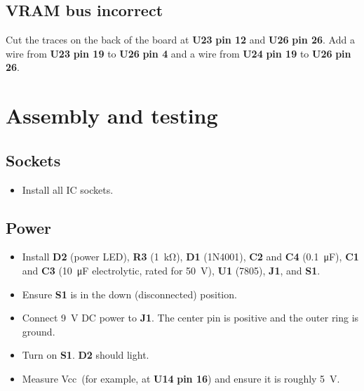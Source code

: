 \documentclass[letterpaper,11pt]{article}
\newcommand{\net}[1]{\textsf{#1}}
\newcommand{\Vcc}{\net{Vcc}}
\newcommand{\pin}[1]{\textbf{pin #1}}
\newcommand{\rpin}[2]{\refdes{#1} \pin{#2}}
\newcommand{\refdes}[1]{\textbf{#1}}
\newcommand{\kohm}[1]{\SI{#1}{\kilo\ohm}}
\newcommand{\uF}[1]{\SI{#1}{\micro\farad}}
\newcommand{\V}[1]{\SI{#1}{\volt}}
\begin{document}
\subsection{VRAM bus incorrect}
Cut the traces on the back of the board at \rpin{U23}{12} and \rpin{U26}{26}. Add a wire from \rpin{U23}{19} to \rpin{U26}{4} and a wire from \rpin{U24}{19} to \rpin{U26}{26}.

\section{Assembly and testing}

\subsection{Sockets}
\begin{itemize}
\item Install all IC sockets.
\end{itemize}

\subsection{Power}
\begin{itemize}
\item Install \refdes{D2} (power LED), \refdes{R3} (\kohm{1}), \refdes{D1} (1N4001), \refdes{C2} and \refdes{C4} (\uF{0.1}), \refdes{C1} and \refdes{C3} (\uF{10} electrolytic, rated for \V{50}), \refdes{U1} (7805), \refdes{J1}, and \refdes{S1}.
\item Ensure \refdes{S1} is in the down (disconnected) position.
\item Connect \V{9} DC power to \refdes{J1}. The center pin is positive and the outer ring is ground.
\item Turn on \refdes{S1}. \refdes{D2} should light.
\item Measure \Vcc\ (for example, at \refdes{U14} \pin{16}) and ensure it is roughly \V{5}.
\end{itemize}
\end{document}
